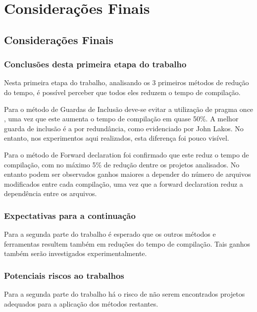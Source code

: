 \part{Considerações Finais}

\chapter[Considerações Finais]{Considerações Finais}

\section{Conclusões desta primeira etapa do trabalho}

Nesta primeira etapa do trabalho, analisando os 3 primeiros
 métodos de redução do tempo, é possível perceber que todos
 eles reduzem o tempo de compilação.

Para o método de Guardas de Inclusão deve-se evitar a
 utilização de pragma once , uma vez que este aumenta
 o tempo de compilação em quase 50\%. A melhor guarda
 de inclusão é a por redundância, como evidenciado por
 John Lakos. No entanto, nos experimentos aqui realizados,
 esta diferença foi pouco visível.

Para o método de Forward declaration foi confirmado que
 este reduz o tempo de compilação, com no máximo 5\% de redução
 dentre os projetos analisados. No entanto podem ser observados
 ganhos maiores a depender do número de arquivos modificados
 entre cada compilação, uma vez que a forward declaration
 reduz a dependência entre os  arquivos.

\section{Expectativas para a continuação}

Para a segunda parte do trabalho é esperado que os
 outros métodos e ferramentas resultem também em
 reduções do tempo de compilação. Tais ganhos
 também serão investigados experimentalmente.  

\section{Potenciais riscos ao trabalhos}

Para a segunda parte do trabalho há o risco de não 
serem encontrados projetos adequados para a aplicação
 dos métodos restantes.

